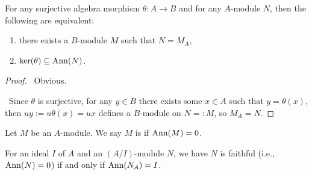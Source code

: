\begin{proposition}\label{prop:2.4}
For any surjective algebra morphism $\theta\colon A\to B$ and for any
$A$-module $N$, then the following are equivalent:
\begin{enumerate}
\item there exists a $B$-module $M$ such that $N=M_{A}$,
\item $\ker(\theta)\subseteq\operatorname{Ann}(N)$.
\end{enumerate}
\end{proposition}

\begin{proof}
\forwardproof\ Obvious.

\backwardproof\ Since $\theta$ is surjective, for any $y\in B$ there
exists some $x\in A$ such that $y=\theta(x)$, then $uy:=u\theta(x)=ux$
defines a $B$-module on $N=:M$, so $M_{A}=N$.
\end{proof}

\begin{definition}
Let $M$ be an $A$-module. We say $M$ is  if $\operatorname{Ann}(M)=0$.
\end{definition}

\begin{corollary}
For an ideal $I$ of $A$ and an $(A/I)$-module $N$, we have $N$ is
faithful (i.e., $\operatorname{Ann}(N)=0$) if and only if $\operatorname{Ann}(N_{A})=I$.
\end{corollary}